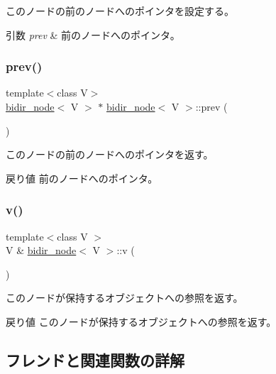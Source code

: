このノードの前のノードへのポインタを設定する。 
\begin{DoxyParams}{引数}
{\em prev} & 前のノードへのポインタ。 \\
\hline
\end{DoxyParams}
\hypertarget{classbidir__node_a4316757bf16173a1c04d84ddbc7fefc2}{}\label{classbidir__node_a4316757bf16173a1c04d84ddbc7fefc2} 
\subsubsection{\texorpdfstring{prev()}{prev()}\hspace{0.1cm}{\footnotesize\ttfamily [2/2]}}
{\footnotesize\ttfamily template$<$class V$>$ \\
\hyperlink{classbidir__node}{bidir\+\_\+node}$<$ V $>$ $\ast$ \hyperlink{classbidir__node}{bidir\+\_\+node}$<$ V $>$\+::prev (\begin{DoxyParamCaption}{ }\end{DoxyParamCaption})}

このノードの前のノードへのポインタを返す。 \begin{DoxyReturn}{戻り値}
前のノードへのポインタ。 
\end{DoxyReturn}
\hypertarget{classbidir__node_a144596c53772e441240d51afeb8a475d}{}\label{classbidir__node_a144596c53772e441240d51afeb8a475d} 
\subsubsection{\texorpdfstring{v()}{v()}}
{\footnotesize\ttfamily template$<$class V $>$ \\
V \& \hyperlink{classbidir__node}{bidir\+\_\+node}$<$ V $>$\+::v (\begin{DoxyParamCaption}{ }\end{DoxyParamCaption})}

このノードが保持するオブジェクトへの参照を返す。 \begin{DoxyReturn}{戻り値}
このノードが保持するオブジェクトへの参照を返す。 
\end{DoxyReturn}


\subsection{フレンドと関連関数の詳解}
\hypertarget{classbidir__node_a8840f01b46a3b9c43a461591a579c1bd}{}\label{classbidir__node_a8840f01b46a3b9c43a461591a579c1bd} 
